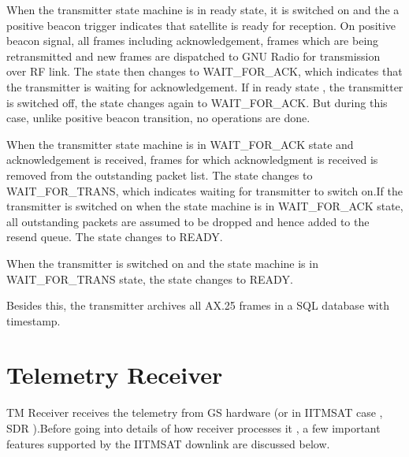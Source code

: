 \documentclass[BTech]{iitmdiss}
\begin{document}
\par When the transmitter state machine is in ready state, it is switched on and the a positive beacon trigger indicates that satellite is ready for reception. On positive beacon signal, all frames including acknowledgement, frames which are being retransmitted and new frames are dispatched to GNU Radio for transmission over RF link. The state then changes to WAIT\_FOR\_ACK, which indicates that the transmitter is waiting for acknowledgement. If in ready state , the transmitter is switched off, the state changes again to WAIT\_FOR\_ACK. But during this case, unlike positive beacon transition, no operations are done.  
\par When the transmitter state machine is in WAIT\_FOR\_ACK state and acknowledgement is received, frames for which acknowledgment is received is removed from the outstanding packet list. The state changes to WAIT\_FOR\_TRANS, which indicates waiting for transmitter to switch on.If the transmitter is switched on when the state machine is in WAIT\_FOR\_ACK state, all outstanding packets are assumed to be dropped and hence added to the resend queue. The state changes to READY.
\par When the transmitter is switched on and the state machine is in WAIT\_FOR\_TRANS state, the state changes to READY. 


Besides this, the transmitter archives all AX.25 frames in a SQL database with timestamp.
\section{Telemetry Receiver}
TM Receiver receives the telemetry from GS hardware (or in IITMSAT case , SDR ).Before going into details of how receiver processes it , a few important features supported by the IITMSAT downlink are discussed below. 
\end{document}
